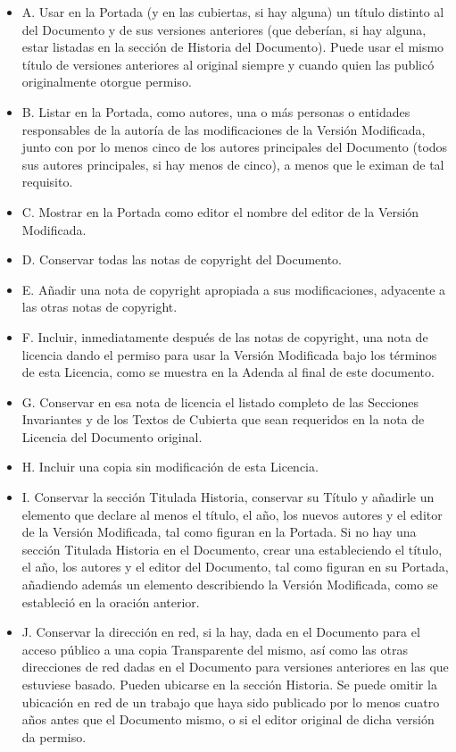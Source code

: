 \documentclass[letterpaper,12pt,titlepage]{article}
\begin{document}
\begin{itemize}
	\item A. Usar en la Portada (y en las cubiertas, si hay alguna) un título distinto al del Documento y de sus versiones anteriores (que deberían, si hay alguna, estar listadas en la sección de Historia del Documento). Puede usar el mismo título de versiones anteriores al original siempre y cuando quien las publicó originalmente otorgue permiso.
	\item B. Listar en la Portada, como autores, una o más personas o entidades responsables de la autoría de las modificaciones de la Versión Modificada, junto con por lo menos cinco de los autores principales del Documento (todos sus autores principales, si hay menos de cinco), a menos que le eximan de tal requisito.
	\item C. Mostrar en la Portada como editor el nombre del editor de la Versión Modificada.
	\item D. Conservar todas las notas de copyright del Documento.
	\item E. Añadir una nota de copyright apropiada a sus modificaciones, adyacente a las otras notas de copyright.
	\item F. Incluir, inmediatamente después de las notas de copyright, una nota de licencia dando el permiso para usar la Versión Modificada bajo los términos de esta Licencia, como se muestra en la Adenda al final de este documento.
	\item G. Conservar en esa nota de licencia el listado completo de las Secciones Invariantes y de los Textos de Cubierta que sean requeridos en la nota de Licencia del Documento original.
	\item H. Incluir una copia sin modificación de esta Licencia.
	\item I. Conservar la sección Titulada Historia, conservar su Título y añadirle un elemento que declare al menos el título, el año, los nuevos autores y el editor de la Versión Modificada, tal como figuran en la Portada. Si no hay una sección Titulada Historia en el Documento, crear una estableciendo el título, el año, los autores y el editor del Documento, tal como figuran en su Portada, añadiendo además un elemento describiendo la Versión Modificada, como se estableció en la oración anterior.
	\item J. Conservar la dirección en red, si la hay, dada en el Documento para el acceso público a una copia Transparente del mismo, así como las otras direcciones de red dadas en el Documento para versiones anteriores en las que estuviese basado. Pueden ubicarse en la sección Historia. Se puede omitir la ubicación en red de un trabajo que haya sido publicado por lo menos cuatro años antes que el Documento mismo, o si el editor original de dicha versión da permiso.

\end{itemize}
\end{document}
